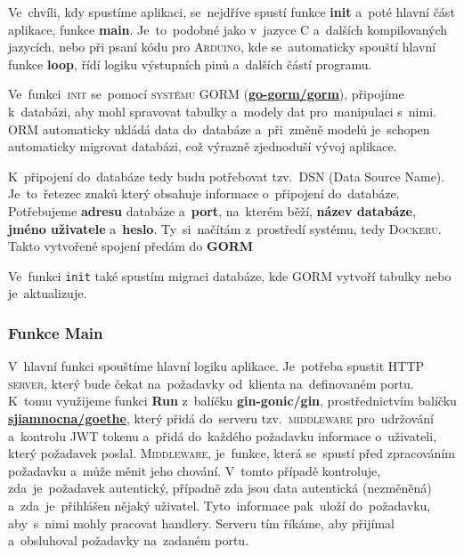 \documentclass[14pt,a4paper]{article}
\begin{document}
            Ve~chvíli, kdy spustíme aplikaci, se~nejdříve spustí funkce \textbf{init} a~poté hlavní část aplikace, funkce \textbf{main}. Je~to~podobné jako v~jazyce C a~dalších kompilovaných jazycích, nebo při psaní kódu pro \textsc{Arduino}, kde se~automaticky spouští hlavní funkce \textbf{loop}, řídí logiku výstupních pinů a~dalších částí programu.
            
            Ve~funkci~\textsc{init} se~pomocí \textsc{systému GORM} (\href{https://gorm.io/}{\textbf{go-gorm/gorm}}), připojíme k~databázi, aby mohl spravovat tabulky a~modely dat pro~manipulaci s~nimi. ORM automaticky ukládá data do~databáze a~při~změně modelů je~schopen automaticky migrovat databázi, což výrazně zjednoduší vývoj aplikace.

            K~připojení do~databáze tedy budu potřebovat tzv.~\textsc{DSN} (Data Source Name). Je~to~řetezec znaků který obsahuje informace o~připojení do~databáze. Potřebujeme \textbf{adresu} databáze a~\textbf{port}, na~kterém běží, \textbf{název databáze}, \textbf{jméno uživatele} a~\textbf{heslo}. Ty~si~načítám z~prostředí systému, tedy \textsc{Dockeru}. Takto vytvořené spojení předám do \textbf{GORM}

            Ve~funkci \texttt{init} také spustím migraci databáze, kde \textsc{GORM} vytvoří tabulky nebo je~aktualizuje.


            \subsubsection{Funkce Main}
            V~hlavní funkci spouštíme hlavní logiku aplikace. Je~potřeba spustit \textsc{HTTP server}, který bude čekat na~požadavky od~klienta na~definovaném portu. K~tomu využijeme funkci \textbf{Run} z~balíčku \textbf{gin-gonic/gin}, prostřednictvím balíčku \href{https://gitlab.com/sjiamnocna/goethe}{\textbf{sjiamnocna/goethe}}, který přidá do~serveru tzv.~\textsc{middleware} pro~udržování a~kontrolu \textsc{JWT} tokenu a~přidá do~každého požadavku informace o~uživateli, který požadavek poslal. \textsc{Middleware}, je~funkce, která se~spustí před zpracováním požadavku a~může měnit jeho chování. V~tomto případě kontroluje, zda~je~požadavek autentický, případně zda jsou data autentická (nezměněná) a~zda~je~přihlášen nějaký uživatel. Tyto~informace pak~uloží do~požadavku, aby~s~nimi mohly pracovat handlery. Serveru tím říkáme, aby přijímal a~obsluhoval požadavky na~zadaném portu.
            
\end{document}
